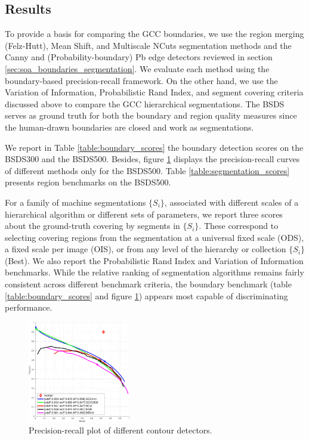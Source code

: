 \documentclass[journal]{IEEEtran}
\begin{document}
\subsection{Results}
To provide a basis for comparing the GCC boundaries, we use the region merging (Felz-Hutt), Mean Shift, and Multiscale NCuts segmentation methods and the Canny and (Probability-boundary) Pb edge detectors reviewed in section \ref{sec:soa_boundaries_segmentation}. We evaluate each method using the boundary-based precision-recall framework. On the other hand, we use the Variation of Information, Probabilistic Rand Index, and segment covering criteria discussed above to compare the GCC hierarchical segmentations. The BSDS serves as ground truth for both the boundary and region quality measures since the human-drawn boundaries are closed and work as segmentations.

We report in Table \ref{table:boundary_scores} the boundary detection scores on the BSDS300 and the BSDS500. Besides, figure \ref{fig:pr_curves} displays the precision-recall curves of different methods only for the BSDS500. Table \ref{table:segmentation_scores} presents region benchmarks on the BSDS500. 

For a family of machine segmentations $\{S_i\}$, associated with different scales of a hierarchical algorithm or different sets of parameters, we report three scores about the ground-truth covering by segments in $\{S_i\}$. These correspond to selecting covering regions from the segmentation at a universal fixed scale (ODS), a fixed scale per image (OIS), or from any level of the hierarchy or collection $\{S_i\}$ (Best). We also report the Probabilistic Rand Index and Variation of Information benchmarks. While the relative ranking of segmentation algorithms remains fairly consistent across different benchmark criteria, the boundary benchmark (table \ref{table:boundary_scores} and figure \ref{fig:pr_curves}) appears most capable of discriminating performance.



\begin{figure}[!ht]
	\centering
	\includegraphics[width=0.4\textwidth]{pr_curves_mymethod}
	\caption{Precision-recall plot of different contour detectors.}\label{fig:pr_curves}
\end{figure}
\end{document}
